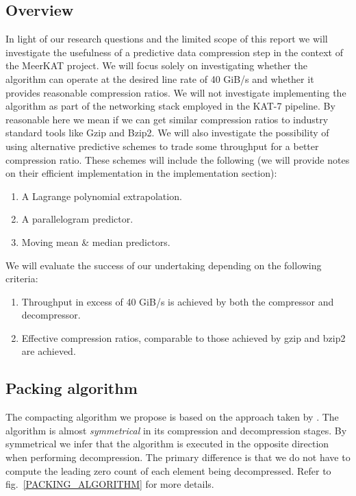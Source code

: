 \documentclass{acm_proc_article-sp}
\begin{document}
\subsection{Overview}
In light of our research questions and the limited scope of this report we will investigate the usefulness of a predictive data compression 
step in the context of the MeerKAT project. We will focus solely on investigating whether the algorithm can operate at the desired line rate of
40 GiB/s and whether it provides reasonable compression ratios. We will not investigate implementing the algorithm as part of the networking stack 
employed in the KAT-7 pipeline. By reasonable here we mean if we can get similar compression ratios to industry standard tools like Gzip and Bzip2. 
We will also investigate the possibility of using alternative predictive schemes to trade some throughput for a better compression ratio.
These schemes will include the following (we will provide notes on their efficient implementation in the implementation section):
\begin{enumerate}
 \item A Lagrange polynomial extrapolation.
 \item A parallelogram predictor.
 \item Moving mean \& median predictors.
\end{enumerate}
We will evaluate the success of our undertaking depending on the following criteria:
\begin{enumerate}
 \item Throughput in excess of 40 GiB/s is achieved by both the compressor and decompressor.
 \item Effective compression ratios, comparable to those achieved by gzip and bzip2 are achieved.
\end{enumerate}
\subsection{Packing algorithm}
The compacting algorithm we propose is based on the approach taken by \cite{O'Neil:2011:FDC:1964179.1964189}. The algorithm is almost \textit{symmetrical} in its compression and 
decompression stages. By symmetrical we infer that  the algorithm is executed in the opposite direction when performing decompression. The primary difference is that we do not have to compute
the leading zero count of each element being decompressed. Refer to fig.~\ref{PACKING_ALGORITHM} for more details.
\end{document}
